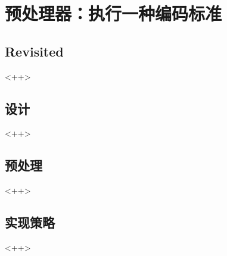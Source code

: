 

\chapter{ 预处理器：执行一种编码标准}
\label{ch:Preprocessor}

\section{ Revisited}<++>

\section{设计}<++>

\section{预处理}<++>

\section{实现策略}<++>

